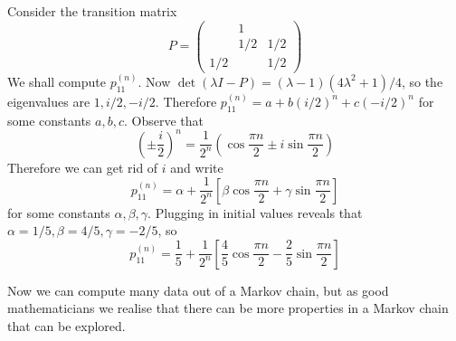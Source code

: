 \begin{example}
    Consider the transition matrix
    $$P=\begin{pmatrix}
        &1&\\
        &1/2&1/2\\
        1/2&&1/2
    \end{pmatrix}$$
    We shall compute $p_{11}^{(n)}$.
    Now $\det(\lambda I-P)=(\lambda-1)(4\lambda^2+1)/4$, so the eigenvalues are $1,i/2,-i/2$.
    Therefore $p_{11}^{(n)}=a+b(i/2)^n+c(-i/2)^n$ for some constants $a,b,c$.
    Observe that
    $$\left(\pm\frac{i}{2}\right)^n=\frac{1}{2^n}\left(\cos\frac{\pi n}{2}\pm i\sin\frac{\pi n}{2}\right)$$
    Therefore we can get rid of $i$ and write
    $$p_{11}^{(n)}=\alpha+\frac{1}{2^n}\left[\beta\cos\frac{\pi n}{2}+\gamma\sin\frac{\pi n}{2}\right]$$
    for some constants $\alpha,\beta,\gamma$.
    Plugging in initial values reveals that $\alpha=1/5,\beta=4/5,\gamma=-2/5$, so
    $$p_{11}^{(n)}=\frac{1}{5}+\frac{1}{2^n}\left[\frac{4}{5}\cos\frac{\pi n}{2}-\frac{2}{5}\sin\frac{\pi n}{2}\right]$$
\end{example}
Now we can compute many data out of a Markov chain, but as good mathematicians we realise that there can be more properties in a Markov chain that can be explored.